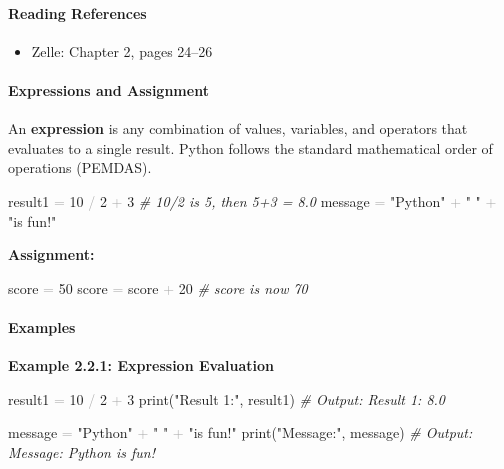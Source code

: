 \documentclass[
  justified,
  openright,
]{tufte-book}
\let\subsection\paragraph
\let\paragraph\paragraph
\newcommand{\StringTok}[1]{\textcolor{CodeString}{#1}}              %
\newcommand{\CommentTok}[1]{\textcolor{CodeComment}{\textit{#1}}}  %
\newcommand{\CodeNumTok}[1]{\textcolor{CodeNumber}{#1}}             %
\newcommand{\OperatorTok}[1]{\textcolor{DarkGray}{#1}}              %
\newenvironment{Shaded}{%
  \begin{mdframed}[style=TufteCode]%
}{%
  \end{mdframed}%
}
\let\subsection\paragraph
\let\paragraph\paragraph
\providecommand{\tightlist}{%
  \setlength{\itemsep}{0pt}\setlength{\parskip}{0pt}}
\begin{document}
\subsection{Reading References}\label{reading-references-8}

\begin{itemize}
\tightlist
\item
  Zelle: Chapter 2, pages 24--26
\end{itemize}

\subsection{Expressions and
Assignment}\label{expressions-and-assignment}

An \textbf{expression} is any combination of values, variables, and
operators that evaluates to a single result. Python follows the standard
mathematical order of operations (PEMDAS).

\begin{Shaded}
\begin{Highlighting}[]
result1 \OperatorTok{=} \CodeNumTok{10} \OperatorTok{/} \CodeNumTok{2} \OperatorTok{+} \CodeNumTok{3}  \CommentTok{\# 10/2 is 5, then 5+3 = 8.0}
message \OperatorTok{=} \StringTok{"Python"} \OperatorTok{+} \StringTok{" "} \OperatorTok{+} \StringTok{"is fun!"}
\end{Highlighting}
\end{Shaded}

\textbf{Assignment:}

\begin{Shaded}
\begin{Highlighting}[]
score \OperatorTok{=} \CodeNumTok{50}
score \OperatorTok{=} score \OperatorTok{+} \CodeNumTok{20}  \CommentTok{\# score is now 70}
\end{Highlighting}
\end{Shaded}

\subsection{Examples}\label{examples-2}

\textbf{Example 2.2.1: Expression Evaluation}

\begin{Shaded}
\begin{Highlighting}[]
result1 \OperatorTok{=} \CodeNumTok{10} \OperatorTok{/} \CodeNumTok{2} \OperatorTok{+} \CodeNumTok{3}
print(\StringTok{"Result 1:"}, result1)   \CommentTok{\# Output: Result 1: 8.0}
 
message \OperatorTok{=} \StringTok{"Python"} \OperatorTok{+} \StringTok{" "} \OperatorTok{+} \StringTok{"is fun!"}
print(\StringTok{"Message:"}, message)    \CommentTok{\# Output: Message: Python is fun!}
\end{Highlighting}
\end{Shaded}
\end{document}
